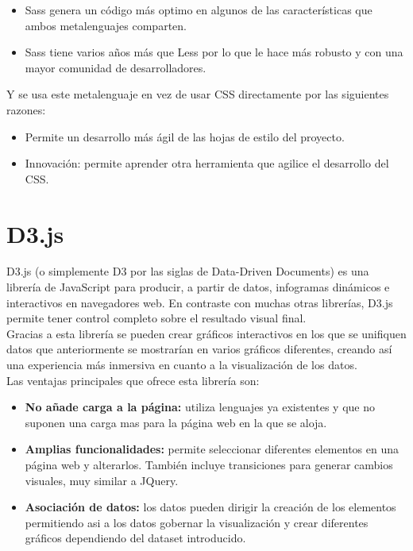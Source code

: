\begin{itemize}
	\item Sass genera un código más optimo en algunos de las características que ambos metalenguajes comparten.
	\item Sass tiene varios años más que Less por lo que le hace más robusto y con una mayor comunidad de desarrolladores.
\end{itemize}

Y se usa este metalenguaje en vez de usar CSS directamente por las siguientes razones:

\begin{itemize}
	\item Permite un desarrollo más ágil de las hojas de estilo del proyecto.
	\item Innovación: permite aprender otra herramienta que agilice el desarrollo del CSS.
\end{itemize}

\section{D3.js}
D3.js (o simplemente D3 por las siglas de Data-Driven Documents) es una librería de JavaScript para producir, a partir de datos, infogramas dinámicos e interactivos en navegadores web. En contraste con muchas otras librerías, D3.js permite tener control completo sobre el resultado visual final.\\

Gracias a esta librería se pueden crear gráficos interactivos en los que se unifiquen datos que anteriormente se mostrarían en varios gráficos diferentes, creando así una experiencia más inmersiva en cuanto a la visualización de los datos. \\

Las ventajas principales que ofrece esta librería son:
\begin{itemize}
	\item \textbf{No añade carga a la página:} utiliza lenguajes ya existentes y que no suponen una carga mas para la página web en la que se aloja.
	\item \textbf{Amplias funcionalidades:} permite seleccionar diferentes elementos en una página web y alterarlos. También incluye transiciones para generar cambios visuales, muy similar a JQuery.
	\item \textbf{Asociación de datos:} los datos pueden dirigir la creación de los elementos permitiendo asi a los datos gobernar la visualización y crear diferentes gráficos dependiendo del dataset introducido.
\end{itemize}

